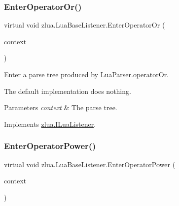 \subsubsection{\texorpdfstring{Enter\+Operator\+Or()}{EnterOperatorOr()}}
{\footnotesize\ttfamily virtual void zlua.\+Lua\+Base\+Listener.\+Enter\+Operator\+Or (\begin{DoxyParamCaption}\item[{\mbox{[}\+Not\+Null\mbox{]} \mbox{\hyperlink{classzlua_1_1_lua_parser_1_1_operator_or_context}{Lua\+Parser.\+Operator\+Or\+Context}}}]{context }\end{DoxyParamCaption})\hspace{0.3cm}{\ttfamily [virtual]}}



Enter a parse tree produced by Lua\+Parser.\+operator\+Or. 

The default implementation does nothing.


\begin{DoxyParams}{Parameters}
{\em context} & The parse tree.\\
\hline
\end{DoxyParams}


Implements \mbox{\hyperlink{interfacezlua_1_1_i_lua_listener_a9e722ddbc7e68d0fc367518365257711}{zlua.\+I\+Lua\+Listener}}.

\mbox{\label{classzlua_1_1_lua_base_listener_ad21692d9754c71a80f6c0378e0697f02}} 
\subsubsection{\texorpdfstring{Enter\+Operator\+Power()}{EnterOperatorPower()}}
{\footnotesize\ttfamily virtual void zlua.\+Lua\+Base\+Listener.\+Enter\+Operator\+Power (\begin{DoxyParamCaption}\item[{\mbox{[}\+Not\+Null\mbox{]} \mbox{\hyperlink{classzlua_1_1_lua_parser_1_1_operator_power_context}{Lua\+Parser.\+Operator\+Power\+Context}}}]{context }\end{DoxyParamCaption})\hspace{0.3cm}{\ttfamily [virtual]}}



